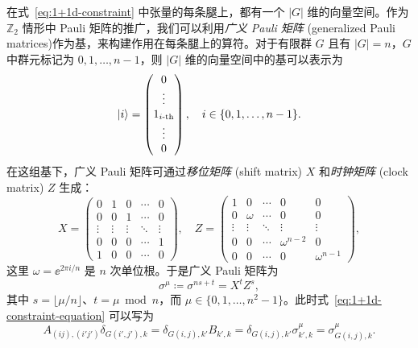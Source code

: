 在式~\eqref{eq:1+1d-constraint} 中张量的每条腿上，都有一个 $|G|$ 维的向量空间。作为 $\mathbb{Z}_2$ 情形中 Pauli 矩阵的推广，我们可以利用\emph{广义 Pauli 矩阵} (generalized Pauli matrices)\cite{patera1988pauli}作为基，来构建作用在每条腿上的算符。对于有限群 $G$ 且有 $|G|=n$，$G$ 中群元标记为 $0, 1, \dots, n-1$，则 $|G|$ 维的向量空间中的基可以表示为
\begin{equation}
  \ket{i} = \begin{pmatrix} 0 \\ \vdots \\ 1_{\text{$i$-th}} \\ \vdots \\ 0 \end{pmatrix}, \quad
  i \in \{ 0, 1, \dots, n-1 \}.
\end{equation}
在这组基下，广义 Pauli 矩阵可通过\emph{移位矩阵} (shift matrix) $X$ 和\emph{时钟矩阵} (clock matrix) $Z$ 生成：
\begin{equation}
  X = \begin{pmatrix}
    0      & 1      & 0      & \cdots & 0      \\
    0      & 0      & 1      & \cdots & 0      \\
    \vdots & \vdots & \vdots & \ddots & \vdots \\
    0      & 0      & 0      & \cdots & 1      \\
    1      & 0      & 0      & \cdots & 0
  \end{pmatrix}, \quad
  Z = \begin{pmatrix}
    1      & 0      & \cdots & 0            & 0      \\
    0      & \omega & \cdots & 0            & 0      \\
    \vdots & \vdots & \ddots & \vdots       & \vdots \\
    0      & 0      & \cdots & \omega^{n-2} & 0      \\
    0      & 0      & \cdots & 0            &\omega^{n-1}
  \end{pmatrix},
  \label{eq:generalized-pauli-matrices}
\end{equation}
这里 $\omega=\ee^{2\pi i/n}$ 是 $n$ 次单位根。于是广义 Pauli 矩阵为
\begin{equation}
  \sigma^\mu \coloneq \sigma^{ns+t} = X^t Z^s,
\end{equation}
其中 $s=\lfloor \mu/n\rfloor$、$t=\mu\bmod n$，而 $\mu\in\{0,1,\dots,n^2-1\}$。此时式~\eqref{eq:1+1d-constraint-equation} 可以写为
\begin{equation}
    A_{(ij), (i'j')} \delta_{G(i',j'), k}
  = \delta_{G(i,j), k'} B_{k', k}
  = \delta_{G(i,j), k'} \sigma^\mu_{k', k}
  = \sigma^\mu_{G(i,j), k}.
\end{equation}
